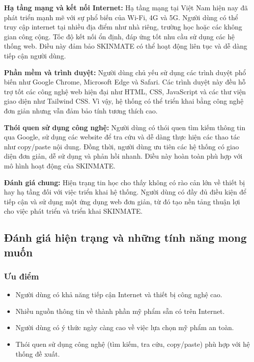 \documentclass[12pt,a4paper]{article}
\begin{document}
\textbf{Hạ tầng mạng và kết nối Internet:}  
Hạ tầng mạng tại Việt Nam hiện nay đã phát triển mạnh mẽ với sự phổ biến của Wi-Fi, 4G và 5G. Người dùng có thể truy cập internet tại nhiều địa điểm như nhà riêng, trường học hoặc các không gian công cộng. Tốc độ kết nối ổn định, đáp ứng tốt nhu cầu sử dụng các hệ thống web. Điều này đảm bảo SKINMATE có thể hoạt động liên tục và dễ dàng tiếp cận người dùng.

\textbf{Phần mềm và trình duyệt:}  
Người dùng chủ yếu sử dụng các trình duyệt phổ biến như Google Chrome, Microsoft Edge và Safari. Các trình duyệt này đều hỗ trợ tốt các công nghệ web hiện đại như HTML, CSS, JavaScript và các thư viện giao diện như Tailwind CSS. Vì vậy, hệ thống có thể triển khai bằng công nghệ đơn giản nhưng vẫn đảm bảo tính tương thích cao.

\textbf{Thói quen sử dụng công nghệ:}  
Người dùng có thói quen tìm kiếm thông tin qua Google, sử dụng các website để tra cứu và dễ dàng thực hiện các thao tác như copy/paste nội dung. Đồng thời, người dùng ưu tiên các hệ thống có giao diện đơn giản, dễ sử dụng và phản hồi nhanh. Điều này hoàn toàn phù hợp với mô hình hoạt động của SKINMATE.

\textbf{Đánh giá chung:}  
Hiện trạng tin học cho thấy không có rào cản lớn về thiết bị hay hạ tầng đối với việc triển khai hệ thống. Người dùng có đầy đủ điều kiện để tiếp cận và sử dụng một ứng dụng web đơn giản, từ đó tạo nền tảng thuận lợi cho việc phát triển và triển khai SKINMATE.


\subsection{Đánh giá hiện trạng và những tính năng mong muốn}

\subsubsection{Ưu điểm}

\begin{itemize}
    \item Người dùng có khả năng tiếp cận Internet và thiết bị công nghệ cao.
    \item Nhiều nguồn thông tin về thành phần mỹ phẩm sẵn có trên Internet.
    \item Người dùng có ý thức ngày càng cao về việc lựa chọn mỹ phẩm an toàn.
    \item Thói quen sử dụng công nghệ (tìm kiếm, tra cứu, copy/paste) phù hợp với hệ thống đề xuất.
\end{itemize}
\end{document}
